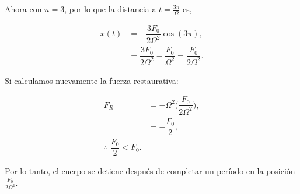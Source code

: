 \documentclass[../main.tex]{subfiles}
\begin{document}
Ahora con \(n = 3\), por lo que la distancia a \(t = \tfrac{3\pi}{\Omega}\) es,

\begin{align*}
	x(t) & = -\dfrac{3F_{0}}{2\Omega^{2}}\cos(3\pi),                                               \\
	     & = \dfrac{3F_{0}}{2\Omega^{2}} - \dfrac{F_{0}}{\Omega^{2}} = \dfrac{F_{0}}{2\Omega^{2}}.
\end{align*}

Si calculamos nuevamente la fuerza restaurativa:

\begin{align*}
	F_{R} & = -\Omega^{2}\biggl(\dfrac{F_{0}}{2\Omega^{2}}\biggr), \\
	      & = -\dfrac{F_{0}}{2},                                   \\
	\therefore\; \dfrac{F_{0}}{2} < F_{0}.
\end{align*}

Por lo tanto, el cuerpo se detiene después de completar un período en la
posición \(\tfrac{F_{0}}{2\Omega^{2}}\).
\end{document}
